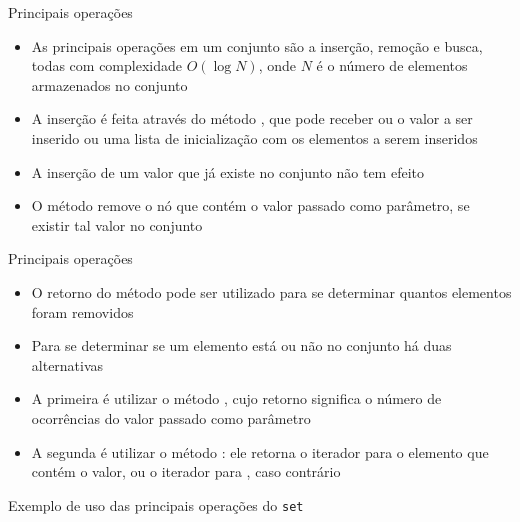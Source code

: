 \begin{frame}[fragile]{Principais operações}

    \begin{itemize}
        \item As principais operações em um conjunto são a inserção, remoção e busca,
        todas com complexidade $O(\log N)$, onde $N$ é o número de elementos armazenados
        no conjunto

        \item A inserção é feita através do método , que pode receber ou o
            valor a ser inserido ou uma lista de inicialização com os elementos a serem
            inseridos

        \item A inserção de um valor que já existe no conjunto não tem efeito

        \item O método  remove o nó que contém o valor passado como parâmetro,
            se existir tal valor no conjunto
    \end{itemize}

\end{frame}

\begin{frame}[fragile]{Principais operações}

    \begin{itemize}
        \item O retorno do método pode ser utilizado para se determinar quantos elementos foram
            removidos

        \item Para se determinar se um elemento está ou não no conjunto há duas alternativas

        \item A primeira é utilizar o método , cujo retorno significa o número
            de ocorrências do valor passado como parâmetro

        \item A segunda é utilizar o método : ele retorna o iterador para o
            elemento que contém o valor, ou o iterador para , caso contrário
    \end{itemize}

\end{frame}

\begin{frame}[fragile]{Exemplo de uso das principais operações do \texttt{set}}
\end{frame}

